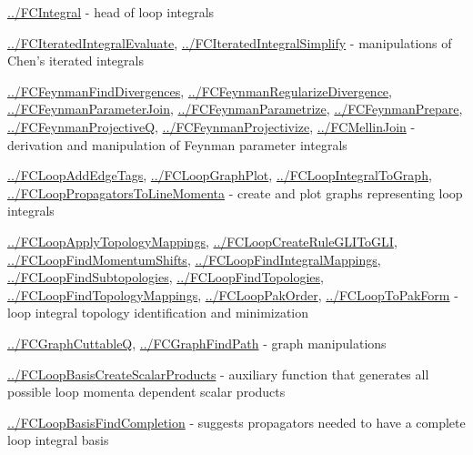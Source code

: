 \documentclass[../FeynCalcManual.tex]{subfiles}
\begin{document}
\begin{itemize}
{\item
  \hyperlink{../fcintegral}{../FCIntegral} - head of loop integrals
\item
  \hyperlink{../fciteratedintegralevaluate}{../FCIteratedIntegralEvaluate},
  \hyperlink{../fciteratedintegralsimplify}{../FCIteratedIntegralSimplify}
  - manipulations of Chen's iterated integrals
\item
  \hyperlink{../fcfeynmanfinddivergences}{../FCFeynmanFindDivergences},
  \hyperlink{../fcfeynmanregularizedivergence}{../FCFeynmanRegularizeDivergence},
  \hyperlink{../fcfeynmanparameterjoin}{../FCFeynmanParameterJoin},
  \hyperlink{../fcfeynmanparametrize}{../FCFeynmanParametrize},
  \hyperlink{../fcfeynmanprepare}{../FCFeynmanPrepare},
  \hyperlink{../fcfeynmanprojectiveq}{../FCFeynmanProjectiveQ},
  \hyperlink{../fcfeynmanprojectivize}{../FCFeynmanProjectivize},
  \hyperlink{../fcmellinjoin}{../FCMellinJoin} - derivation and
  manipulation of Feynman parameter integrals
\item
  \hyperlink{../fcloopaddedgetags}{../FCLoopAddEdgeTags},
  \hyperlink{../fcloopgraphplot}{../FCLoopGraphPlot},
  \hyperlink{../fcloopintegraltograph}{../FCLoopIntegralToGraph},
  \hyperlink{../fclooppropagatorstolinemomenta}{../FCLoopPropagatorsToLineMomenta}
  - create and plot graphs representing loop integrals
\item
  \hyperlink{../fcloopapplytopologymappings}{../FCLoopApplyTopologyMappings},
  \hyperlink{../fcloopcreateruleglitogli}{../FCLoopCreateRuleGLIToGLI},
  \hyperlink{../fcloopfindmomentumshifts}{../FCLoopFindMomentumShifts},
  \hyperlink{../fcloopfindintegralmappings}{../FCLoopFindIntegralMappings},
  \hyperlink{../fcloopfindsubtopologies}{../FCLoopFindSubtopologies},
  \hyperlink{../fcloopfindtopologies}{../FCLoopFindTopologies},
  \hyperlink{../fcloopfindtopologymappings}{../FCLoopFindTopologyMappings},
  \hyperlink{../fclooppakorder}{../FCLoopPakOrder},
  \hyperlink{../fclooptopakform}{../FCLoopToPakForm} - loop integral
  topology identification and minimization
\item
  \hyperlink{../fcgraphcuttableq}{../FCGraphCuttableQ},
  \hyperlink{../fcgraphfindpath}{../FCGraphFindPath} - graph
  manipulations
\item
  \hyperlink{../fcloopbasiscreatescalarproducts}{../FCLoopBasisCreateScalarProducts}
  - auxiliary function that generates all possible loop momenta
  dependent scalar products
\item
  \hyperlink{../fcloopbasisfindcompletion}{../FCLoopBasisFindCompletion}
  - suggests propagators needed to have a complete loop integral basis
}
\end{itemize}
\end{document}
